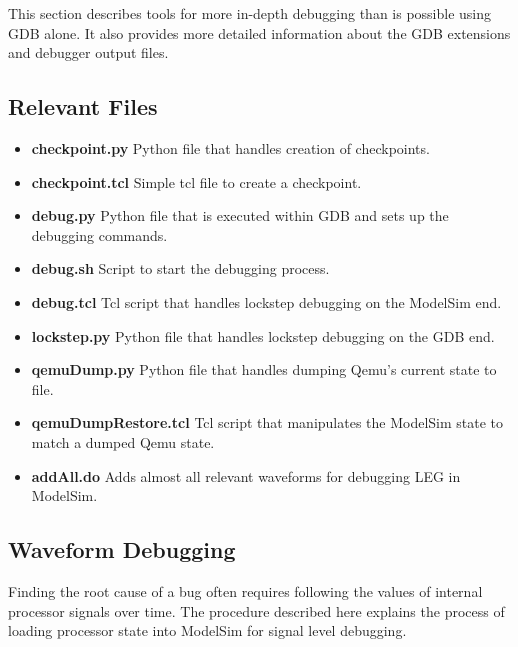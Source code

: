 This section describes tools for more in-depth debugging than is possible using GDB alone. 
It also provides more detailed information about the GDB extensions and debugger output files.

\subsection{Relevant Files}

\begin{itemize}
\item \textbf{checkpoint.py} Python file that handles creation of checkpoints.
\item \textbf{checkpoint.tcl} Simple tcl file to create a checkpoint.
\item \textbf{debug.py} Python file that is executed within GDB and sets up the debugging commands.
\item \textbf{debug.sh} Script to start the debugging process.
\item \textbf{debug.tcl} Tcl script that handles lockstep debugging on the ModelSim end.
\item \textbf{lockstep.py} Python file that handles lockstep debugging on the GDB end.
\item \textbf{qemuDump.py} Python file that handles dumping Qemu's current state to file.
\item \textbf{qemuDumpRestore.tcl} Tcl script that manipulates the ModelSim state to match a dumped Qemu state.
\item \textbf{addAll.do} Adds almost all relevant waveforms for debugging LEG in ModelSim.
\end{itemize}

\subsection{Waveform Debugging}\label{sec:MSdebug}
Finding the root cause of a bug often requires following the values of internal processor signals over time.
The procedure described here explains the process of loading processor state into ModelSim for signal level debugging.

